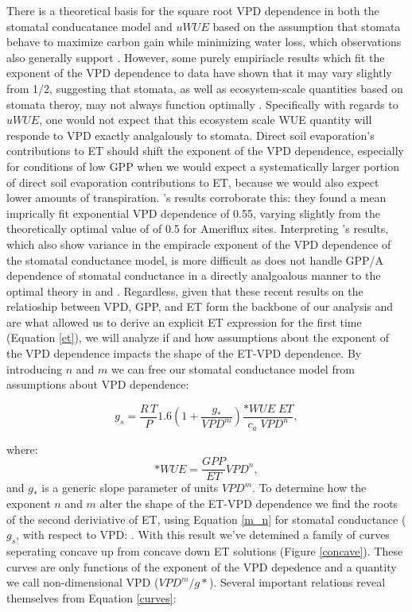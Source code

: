 \documentclass[draft,linenumbers]{agujournal}
\begin{document}
There is a theoretical basis for the square root VPD dependence in
both the stomatal conducatance model and $uWUE$ based on the
assumption that stomata behave to maximize carbon gain while
minimizing water loss, which observations also generally support
\citep{Lloyd_1991, MEDLYN_2011, Lin_2015, Zhou_2014, Zhou_2015,
  Medlyn_2017}. However, some purely empiriacle results which fit the
exponent of the VPD dependence to data have shown that it may vary slightly
from 1/2, suggesting that stomata, as well as ecosystem-scale
quantities based on stomata theroy, may not always function optimally
\citep{Zhou_2015, Lin_2018}. Specifically with regards to $uWUE$, one
would not expect that this ecosystem scale WUE quantity will responde
to VPD exactly analgalously to stomata. Direct soil evaporation's
contributions to ET should shift the exponent of the VPD dependence,
especially for conditions of low GPP when we would expect a
systematically larger portion of direct soil evaporation contributions
to ET, because we would also expect lower amounts of
transpiration. \citet{Zhou_2015}'s results corroborate this: they
found a mean imprically fit exponential VPD dependence of 0.55,
varying slightly from the theoretically optimal value of of 0.5 for
Ameriflux sites. Interpreting \citet{Lin_2018}'s results, which also
show variance in the empiracle exponent of the VPD dependence of the
stomatal conductance model, is more difficult as \citet{Lin_2018} does
not handle GPP/A dependence of stomatal conductance in a directly
analgoalous manner to the optimal theory in \citet{MEDLYN_2011} and
\citet{Medlyn_2017}. Regardless, given that these recent results
\citep{MEDLYN_2011, Zhou_2014, Zhou_2015, Medlyn_2017} on the
relatioship between VPD, GPP, and ET \citep{MEDLYN_2011, Zhou_2014,
  Zhou_2015, Medlyn_2017} form the backbone of our analysis and are
what allowed us to derive an explicit ET expression for the first
time (Equation \ref{et}), we will analyze if and how assumptions about
the exponent of the VPD dependence impacts the shape of the ET-VPD
dependence. By introducing $n$ and $m$ we can free our stomatal
conductance model from assumptions about VPD dependence:
\begin{linenomath*}
  \begin{equation}
    g_s = \frac{R \, T}{P} 1.6 \left(1 + \frac{g_*}{VPD^m}\right) \frac{*WUE \; ET}{c_a \; VPD^n},
    \label{m_n}
  \end{equation}
\end{linenomath*}
where:
\[*WUE = \frac{GPP}{ET}VPD^n,\] and $g_*$ is a generic slope parameter
of units $VPD^m$. To determine how the exponent $n$ and $m$ alter the
shape of the ET-VPD dependence we find the roots of the second
deriviative of ET, using Equation \ref{m_n} for stomatal conductance
($g_s$, with respect to VPD: . With this
result we've detemined a family of curves seperating concave up from
concave down ET solutions (Figure \ref{concave}). These curves are
only functions of the exponent of the VPD depedence and a quantity we
call non-dimensional VPD ($VPD^m/g*$). Several important
relations reveal themselves from Equation \ref{curves}:
\end{document}

